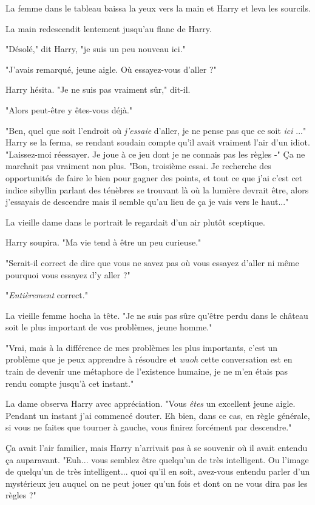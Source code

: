 La femme dans le tableau baissa la yeux vers la main et Harry et leva les sourcils.

La main redescendit lentement jusqu'au flanc de Harry.

"Désolé," dit Harry, "je suis un peu nouveau ici."

"J'avais remarqué, jeune aigle. Où essayez-vous d'aller ?"

Harry hésita. "Je ne suis pas vraiment sûr," dit-il.

"Alors peut-être y êtes-vous déjà."

"Ben, quel que soit l'endroit où \emph{j'essaie}  d'aller, je ne pense pas que ce soit \emph{ici} ..." Harry se la ferma, se rendant soudain compte qu'il avait vraiment l'air d'un idiot. "Laissez-moi réessayer. Je joue à ce jeu dont je ne connais pas les règles -" Ça ne marchait pas vraiment non plus. "Bon, troisième essai. Je recherche des opportunités de faire le bien pour gagner des points, et tout ce que j'ai c'est cet indice sibyllin parlant des ténèbres se trouvant là où la lumière devrait être, alors j'essayais de descendre mais il semble qu'au lieu de ça je vais vers le haut..."

La vieille dame dans le portrait le regardait d'un air plutôt sceptique.

Harry soupira. "Ma vie tend à être un peu curieuse."

"Serait-il correct de dire que vous ne savez pas où vous essayez d'aller ni même pourquoi vous essayez d'y aller ?"

"\emph{Entièrement}  correct."

La vieille femme hocha la tête. "Je ne suis pas sûre qu'être perdu dans le château soit le plus important de vos problèmes, jeune homme."

"Vrai, mais à la différence de mes problèmes les plus importants, c'est un problème que je peux apprendre à résoudre et \emph{waoh}  cette conversation est en train de devenir une métaphore de l'existence humaine, je ne m'en étais pas rendu compte jusqu'à cet instant."

La dame observa Harry avec appréciation. "Vous \emph{êtes}  un excellent jeune aigle. Pendant un instant j'ai commencé douter. Eh bien, dans ce cas, en règle générale, si vous ne faites que tourner à gauche, vous finirez forcément par descendre."

Ça avait l'air familier, mais Harry n'arrivait pas à se souvenir où il avait entendu ça auparavant. "Euh... vous semblez être quelqu'un de très intelligent. Ou l'image de quelqu'un de très intelligent... quoi qu'il en soit, avez-vous entendu parler d'un mystérieux jeu auquel on ne peut jouer qu'un fois et dont on ne vous dira pas les règles ?"

